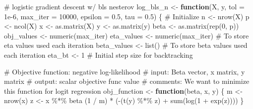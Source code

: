 \documentclass[
  letterpaper,
  DIV=11,
  numbers=noendperiod]{scrartcl}
\newenvironment{Shaded}{\begin{snugshade}}{\end{snugshade}}
\newcommand{\AttributeTok}[1]{\textcolor[rgb]{0.40,0.45,0.13}{#1}}
\newcommand{\CommentTok}[1]{\textcolor[rgb]{0.37,0.37,0.37}{#1}}
\newcommand{\ControlFlowTok}[1]{\textcolor[rgb]{0.00,0.23,0.31}{\textbf{#1}}}
\newcommand{\DecValTok}[1]{\textcolor[rgb]{0.68,0.00,0.00}{#1}}
\newcommand{\FloatTok}[1]{\textcolor[rgb]{0.68,0.00,0.00}{#1}}
\newcommand{\FunctionTok}[1]{\textcolor[rgb]{0.28,0.35,0.67}{#1}}
\newcommand{\NormalTok}[1]{\textcolor[rgb]{0.00,0.23,0.31}{#1}}
\newcommand{\OtherTok}[1]{\textcolor[rgb]{0.00,0.23,0.31}{#1}}
\newcommand{\SpecialCharTok}[1]{\textcolor[rgb]{0.37,0.37,0.37}{#1}}
\begin{document}
\begin{Shaded}
\begin{Highlighting}[]
\CommentTok{\# logistic gradient descent w/ bls nesterov}
\NormalTok{log\_bls\_n }\OtherTok{\textless{}{-}} \ControlFlowTok{function}\NormalTok{(X, y, }\AttributeTok{tol =} \FloatTok{1e{-}6}\NormalTok{, }\AttributeTok{max\_iter =} \DecValTok{10000}\NormalTok{, }\AttributeTok{epsilon =} \FloatTok{0.5}\NormalTok{, }\AttributeTok{tau =} \FloatTok{0.5}\NormalTok{) \{}
  \CommentTok{\# Initialize}
\NormalTok{  n }\OtherTok{\textless{}{-}} \FunctionTok{nrow}\NormalTok{(X)}
\NormalTok{  p }\OtherTok{\textless{}{-}} \FunctionTok{ncol}\NormalTok{(X)}
\NormalTok{  x }\OtherTok{\textless{}{-}} \FunctionTok{as.matrix}\NormalTok{(X)}
\NormalTok{  y }\OtherTok{\textless{}{-}} \FunctionTok{as.matrix}\NormalTok{(y)}
\NormalTok{  beta }\OtherTok{\textless{}{-}} \FunctionTok{as.matrix}\NormalTok{(}\FunctionTok{rep}\NormalTok{(}\DecValTok{0}\NormalTok{, p))}
\NormalTok{  obj\_values }\OtherTok{\textless{}{-}} \FunctionTok{numeric}\NormalTok{(max\_iter)}
\NormalTok{  eta\_values }\OtherTok{\textless{}{-}} \FunctionTok{numeric}\NormalTok{(max\_iter)  }\CommentTok{\# To store eta values used each iteration}
\NormalTok{  beta\_values }\OtherTok{\textless{}{-}} \FunctionTok{list}\NormalTok{() }\CommentTok{\# To store beta values used each iteration}
\NormalTok{  eta\_bt }\OtherTok{\textless{}{-}} \DecValTok{1}  \CommentTok{\# Initial step size for backtracking}
  
  \CommentTok{\# Objective function: negative log{-}likelihood}
  \CommentTok{\# input: Beta vector, x matrix, y matrix}
  \CommentTok{\# output: scalar objective func value}
  \CommentTok{\# comments: We want to minimize this function for logit regression}
\NormalTok{  obj\_function }\OtherTok{\textless{}{-}} \ControlFlowTok{function}\NormalTok{(beta, x, y) \{}
\NormalTok{    m }\OtherTok{\textless{}{-}} \FunctionTok{nrow}\NormalTok{(x)}
\NormalTok{    z }\OtherTok{\textless{}{-}}\NormalTok{ x }\SpecialCharTok{\%*\%}\NormalTok{ beta}
\NormalTok{    (}\DecValTok{1} \SpecialCharTok{/}\NormalTok{ m) }\SpecialCharTok{*}\NormalTok{ (}\SpecialCharTok{{-}}\NormalTok{(}\FunctionTok{t}\NormalTok{(y) }\SpecialCharTok{\%*\%}\NormalTok{ z) }\SpecialCharTok{+} \FunctionTok{sum}\NormalTok{(}\FunctionTok{log}\NormalTok{(}\DecValTok{1} \SpecialCharTok{+} \FunctionTok{exp}\NormalTok{(z))))}
\NormalTok{  \}}
  

\end{Highlighting}
\end{Shaded}
\end{document}
